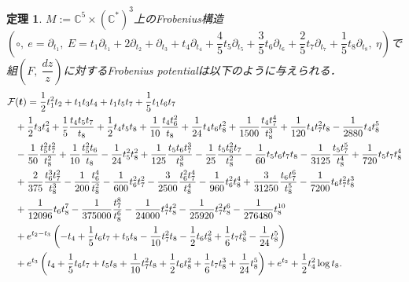 \documentclass[a4paper,11pt]{jbook}
\theoremstyle{plain}
\newtheorem{thm}{定理}[section]
\theoremstyle{definition}
\theoremstyle{remark}
\theoremstyle{proof}
\numberwithin{equation}{section}
\def\CC{{\mathbb C}}
\def\F{{\mathcal F}}
\begin{document}
\begin{thm}\label{pot8}
$M:=\CC^5\times(\CC^*)^3$上の\rm{Frobenius構造}$(\circ, \ e=\partial_{t_1}, \ E=t_1\partial_{t_1}+2\partial_{t_2}+\partial_{t_3}+t_4\partial_{t_4}+\dfrac{4}{5}t_5\partial_{t_5}+\dfrac{3}{5}t_6\partial_{t_6}+\dfrac{2}{5}t_7\partial_{t_7}+\dfrac{1}{5}t_8\partial_{t_8}, \ \eta)$で組$\left(F, \ \dfrac{dz}{z}\right)$に対するFrobenius potentialは以下のように与えられる．
\begin{align}
	\F&(\bm{t})=\dfrac{1}{2}t_1^2t_2+t_1t_3t_4+t_1t_5t_7+\frac{1}{5}t_1t_6t_7 \notag \\
&+\dfrac{1}{2}t_3t_4^2+\frac{1}{5}\frac{t_4t_5t_7}{t_8}+\frac{1}{2}t_4t_5t_8+\frac{1}{10}\frac{t_4t_6^2}{t_8}+\frac{1}{24}t_4t_6t_8^2+\frac{1}{1500}\frac{t_4t_7^4}{t_8^3}+\frac{1}{120}t_4t_7^2t_8-\frac{1}{2880}t_4t_8^5 \notag \\
&-\frac{1}{50}\frac{t_5^2t_7^2}{t_8^2}+\frac{1}{10}\frac{t_5^2t_6}{t_8}-\frac{1}{24}t_5^2t_8^2+\frac{1}{125}\frac{t_5t_6t_7^3}{t_8^3}-\frac{1}{25}\frac{t_5t_6^2t_7}{t_8^2}-\frac{1}{60}t_5t_6t_7t_8-\frac{1}{3125}\frac{t_5t_7^5}{t_8^4}+\frac{1}{720}t_5t_7t_8^4 \notag \\
&+\frac{2}{375}\frac{t_6^3t_7^2}{t_8^3}-\frac{1}{200}\frac{t_6^4}{t_8^2}-\frac{1}{600}t_6^2t_7^2-\frac{3}{2500}\frac{t_6^2t_7^4}{t_8^4}-\frac{1}{960}t_6^2t_8^4+\frac{3}{31250}\frac{t_6t_7^6}{t_8^5}-\frac{1}{7200}t_6t_7^2t_8^3 \notag \\
&+\frac{1}{12096}t_6t_8^7-\frac{1}{375000}\frac{t_7^8}{t_8^6}-\frac{1}{24000}t_7^4t_8^2-\frac{1}{25920}t_7^2t_8^6-\frac{1}{276480}t_8^{10}  \notag \\
&+e^{t_2-t_3}\left(-t_4+\frac{1}{5}t_6t_7+t_5t_8-\frac{1}{10}t_7^2t_8-\frac{1}{2}t_6t_8^2+\frac{1}{6}t_7t_8^3-\frac{1}{24}t_8^5 \right) \notag \\
&+e^{t_3}\left(t_4+\frac{1}{5}t_6t_7+t_5t_8+\frac{1}{10}t_7^2t_8+\frac{1}{2}t_6t_8^2+\frac{1}{6}t_7t_8^3+\frac{1}{24}t_8^5 \right) +e^{t_2}+\dfrac{1}{2}t_4^2\log{t_8}.
\end{align}
\end{thm}
\end{document}
